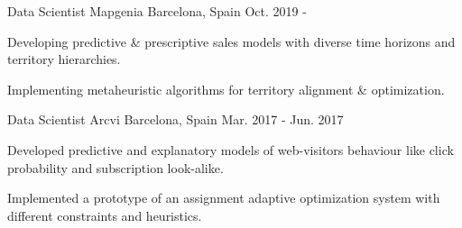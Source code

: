 
\begin{cventries}

\cventry
  {Data Scientist}
  {Mapgenia}
  {Barcelona, Spain}
  {Oct. 2019 - }
  {
    \begin{cvitems}
      \item {Developing predictive \& prescriptive sales models with diverse time horizons and territory hierarchies.}
      \item {Implementing metaheuristic algorithms for territory alignment \& optimization.}
    \end{cvitems}
  }

\cventry
  {Data Scientist}
  {Arcvi}
  {Barcelona, Spain}
  {Mar. 2017 - Jun. 2017}
  {
    \begin{cvitems}
      \item {Developed predictive and explanatory models of web-visitors behaviour like click probability and subscription look-alike.}
      \item {Implemented a prototype of an assignment adaptive optimization system with different constraints and heuristics.}
    \end{cvitems}
  }

\end{cventries}

